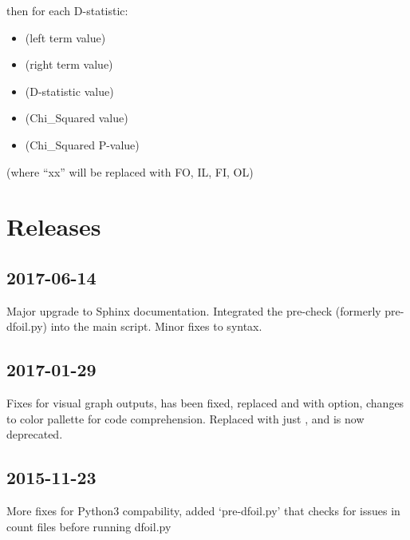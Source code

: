 \documentclass[letterpaper,12pt,english]{sphinxmanual}
\begin{document}
then for each D-statistic:
\begin{itemize}
\item {} 
 (left term value)

\item {} 
 (right term value)

\item {} 
 (D-statistic value)

\item {} 
 (Chi\_Squared value)

\item {} 
 (Chi\_Squared P-value)

\end{itemize}

(where “xx” will be replaced with FO, IL, FI, OL)


\section{Releases}
\label{\detokenize{intro:releases}}

\subsection{2017-06-14}
\label{\detokenize{intro:id1}}
Major upgrade to Sphinx documentation. Integrated the pre-check (formerly pre-dfoil.py) into the main script. Minor fixes to syntax.


\subsection{2017-01-29}
\label{\detokenize{intro:id2}}
Fixes for visual graph outputs,  has been fixed, replaced  and  with  option, changes to color pallette for code comprehension. Replaced  with just , and  is now deprecated.


\subsection{2015-11-23}
\label{\detokenize{intro:id3}}
More fixes for Python3 compability, added ‘pre-dfoil.py’ that checks for issues in count files before running dfoil.py
\end{document}
